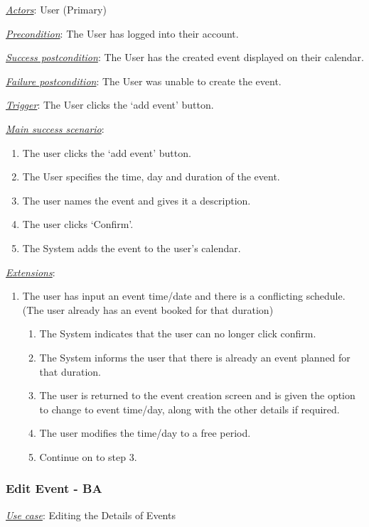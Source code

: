 \documentclass[a4paper]{article}
\begin{document}
\underline{\textit{Actors}}: User (Primary)

\underline{\textit{Precondition}}: The User has logged into their account.

\underline{\textit{Success postcondition}}: The User has the created event displayed on their calendar.

\underline{\textit{Failure postcondition}}: The User was unable to create the event.

\underline{\textit{Trigger}}: The User clicks the ‘add event’ button.

\underline{\textit{Main success scenario}}: 
\begin{enumerate}[leftmargin = 3em]
    \item The user clicks the ‘add event’ button.
    \item The User specifies the time, day and duration of the event.
    \item The user names the event and gives it a description.
    \item The user clicks ‘Confirm’.
    \item The System adds the event to the user’s calendar.
\end{enumerate} 

\underline{\textit{Extensions}}:
\begin{enumerate}[label=2\alph*, leftmargin = 3em]
    \item The user has input an event time/date and there is a conflicting schedule. (The user already has an event booked for that duration) \begin{enumerate}[label=\arabic*.]
        \item The System indicates that the user can no longer click confirm.
        \item The System informs the user that there is already an event planned for that duration.
        \item The user is returned to the event creation screen and is given the option to change to event time/day, along with the other details if required.
        \item The user modifies the time/day to a free period.
        \item Continue on to step 3.
    \end{enumerate}
\end{enumerate}

\subsubsection{Edit Event - BA}
\underline{\textit{Use case}}: Editing the Details of Events
\end{document}
